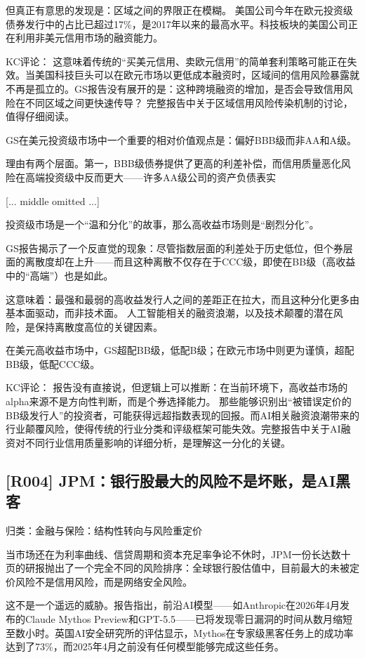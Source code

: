 \documentclass[11pt]{ctexart}
\begin{document}
但真正有意思的发现是：区域之间的界限正在模糊。 美国公司今年在欧元投资级债券发行中的占比已超过17\%，是2017年以来的最高水平。科技板块的美国公司正在利用非美元信用市场的融资能力。

KC评论： 这意味着传统的“买美元信用、卖欧元信用”的简单套利策略可能正在失效。当美国科技巨头可以在欧元市场以更低成本融资时，区域间的信用风险暴露就不再是孤立的。GS报告没有展开的是：这种跨境融资的增加，是否会导致信用风险在不同区域之间更快速传导？ 完整报告中关于区域信用风险传染机制的讨论，值得仔细阅读。

GS在美元投资级市场中一个重要的相对价值观点是：偏好BBB级而非AA和A级。

理由有两个层面。第一，BBB级债券提供了更高的利差补偿，而信用质量恶化风险在高端投资级中反而更大——许多AA级公司的资产负债表实

[... middle omitted ...]

投资级市场是一个“温和分化”的故事，那么高收益市场则是“剧烈分化”。

GS报告揭示了一个反直觉的现象：尽管指数层面的利差处于历史低位，但个券层面的离散度却在上升——而且这种离散不仅存在于CCC级，即使在BB级（高收益中的“高端”）也是如此。

这意味着：最强和最弱的高收益发行人之间的差距正在拉大，而且这种分化更多由基本面驱动，而非技术面。 人工智能相关的融资浪潮，以及技术颠覆的潜在风险，是保持离散度高位的关键因素。

在美元高收益市场中，GS超配BB级，低配B级；在欧元市场中则更为谨慎，超配BB级，低配CCC级。

KC评论： 报告没有直接说，但逻辑上可以推断：在当前环境下，高收益市场的alpha来源不是方向性判断，而是个券选择能力。 那些能够识别出“被错误定价的BB级发行人”的投资者，可能获得远超指数表现的回报。而AI相关融资浪潮带来的行业颠覆风险，使得传统的行业分类和评级框架可能失效。完整报告中关于AI融资对不同行业信用质量影响的详细分析，是理解这一分化的关键。

\subsection{[R004] JPM：银行股最大的风险不是坏账，是AI黑客}
{\small\color{refgray}归类：金融与保险：结构性转向与风险重定价}

当市场还在为利率曲线、信贷周期和资本充足率争论不休时，JPM一份长达数十页的研报抛出了一个完全不同的风险排序：全球银行股估值中，目前最大的未被定价风险不是信用风险，而是网络安全风险。

这不是一个遥远的威胁。报告指出，前沿AI模型——如Anthropic在2026年4月发布的Claude Mythos Preview和GPT-5.5——已将发现零日漏洞的时间从数月缩短至数小时。英国AI安全研究所的评估显示，Mythos在专家级黑客任务上的成功率达到了73\%，而2025年4月之前没有任何模型能够完成这些任务。
\end{document}

